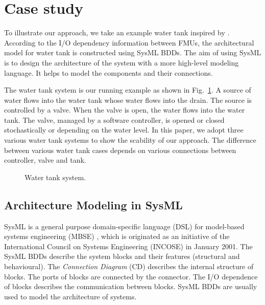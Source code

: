 
\section{Case study}
\label{sec:sysml}
To illustrate our approach, we take an example water tank inspired by \cite{AmalioPCW16}. According to the I/O dependency information between FMUs, the architectural model for water tank is constructed using SysML BDDs. The aim of using SysML is to design the architecture of the system with a more high-level modeling language. It helps to model the components and their connections.

The water tank system is our running example as shown in Fig.~\ref{tankfig}. A source of water flows into the water tank whose water flows into the drain. The source is controlled by a valve. When the valve is open, the water flows into the water tank. The valve, managed by a software controller, is opened or closed stochastically or depending on the water level. In this paper, we adopt three various water tank systems to show the scability of our approach. The difference between various water tank cases depends on various connections between controller, valve and tank. 
\begin{figure}[htbp]
	\caption{Water tank system.}
	\label{tankfig}
\end{figure} 
\subsection{Architecture Modeling in SysML}
SysML is a general purpose domain-specific language (DSL) \cite{SemerathBHSV17} for model-based systems engineering (MBSE) \cite{Dori16}, which is originated as an initiative of the International Council on Systems Engineering (INCOSE) \cite{Pepper2015International} in January 2001. The SysML BDDs describe the system blocks and their features (structural and behavioural). The \textit{Connection Diagram} (CD) describes the internal structure of blocks. The ports of blocks are connected by the connector. The I/O dependence of blocks describes the communication between blocks. SysML BDDs are usually used to model the architecture of systems.

